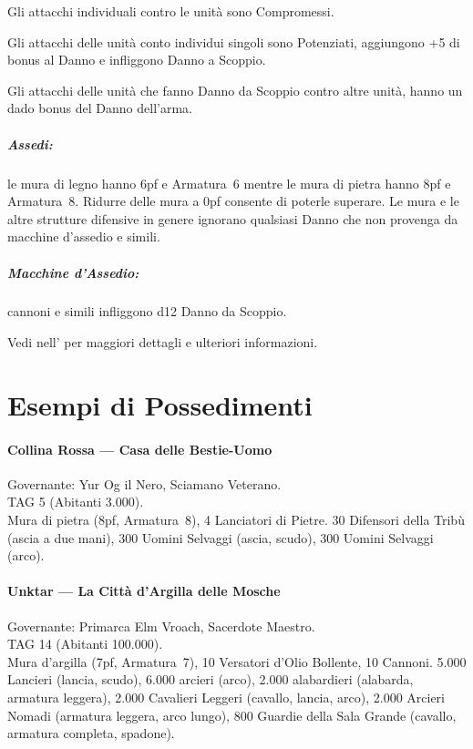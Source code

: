 \documentclass[itdr]{subfiles}
\begin{document}
Gli attacchi individuali contro le unità sono Compromessi.

Gli attacchi delle unità conto individui singoli sono Potenziati, aggiungono +5 di bonus al Danno e infliggono Danno a Scoppio.

Gli attacchi delle unità che fanno Danno da Scoppio contro altre unità, hanno un dado bonus del Danno dell’arma.

\subparagraph{Assedi:} le mura di legno hanno 6pf e Armatura~6 mentre le mura di pietra hanno 8pf e Armatura~8. Ridurre delle mura a 0pf consente di poterle superare. Le mura e le altre strutture difensive in genere ignorano qualsiasi Danno che non provenga da macchine d’assedio e simili.

\subparagraph{Macchine d’Assedio:} cannoni e simili infliggono d12 Danno da Scoppio.

\begin{dbox}
	Vedi \textbf{} nell'\textbf{} per maggiori dettagli e ulteriori informazioni.
\end{dbox}

\vfill

\section{Esempi di Possedimenti}

\paragraph{Collina Rossa --- Casa delle Bestie-Uomo}
Governante: Yur Og il Nero, Sciamano Veterano.\\
TAG 5 (Abitanti 3.000).\\
Mura di pietra (8pf, Armatura~8), 4 Lanciatori di Pietre. 30 Difensori della Tribù (ascia a due mani), 300 Uomini Selvaggi (ascia, scudo), 300 Uomini Selvaggi (arco).

\paragraph{Unktar --- La Città d’Argilla delle Mosche}
Governante: Primarca Elm Vroach, Sacerdote Maestro.\\
TAG 14 (Abitanti 100.000).\\
Mura d’argilla (7pf, Armatura~7), 10 Versatori d’Olio Bollente, 10 Cannoni. 5.000 Lancieri (lancia, scudo), 6.000 arcieri (arco), 2.000 alabardieri (alabarda, armatura leggera), 2.000 Cavalieri Leggeri (cavallo, lancia, arco), 2.000 Arcieri Nomadi (armatura leggera, arco lungo), 800 Guardie della Sala Grande (cavallo, armatura completa, spadone).

\vfill
\end{document}

